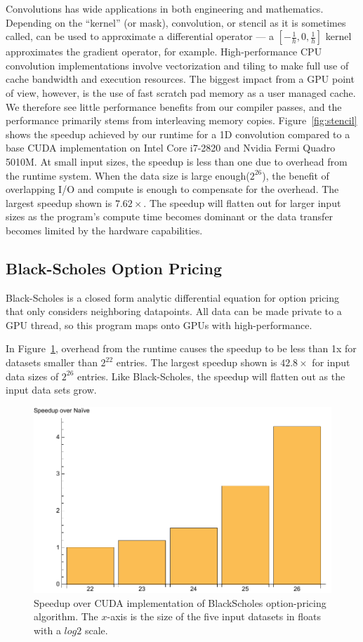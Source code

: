 Convolutions has wide applications in both engineering and mathematics.
Depending on the ``kernel'' (or mask), convolution, or stencil as it is sometimes called,   can be used to approximate a differential operator ---
 a $[-\frac{1}{h}, 0, \frac{1}{h}]$ kernel approximates the gradient operator, for example.
High-performance CPU convolution implementations
involve vectorization and tiling to make full use of cache bandwidth and
execution resources.
The biggest impact from a GPU point of view, however, is the use of fast
  scratch pad memory as a user managed cache.
We therefore see little performance benefits from our compiler passes, and the
  performance primarily stems from interleaving memory copies.
Figure~\ref{fig:stencil} shows the speedup achieved by our runtime for a 1D
  convolution compared to a base CUDA implementation on Intel Core i7-2820 and Nvidia Fermi Quadro 5010M.
At small input sizes, the speedup is less than one due to overhead from the
runtime system. When the data size is large enough($2^{26}$), the benefit of
overlapping I/O and compute is enough to compensate for the overhead. The
largest speedup shown is $7.62\times$. The speedup will flatten out for larger
input sizes as the program's compute time becomes dominant or the data transfer
becomes limited by the hardware capabilities.


\subsection{Black-Scholes Option Pricing}
Black-Scholes is a closed form analytic differential
  equation for option pricing that only
considers neighboring datapoints. All data can be made private to a GPU thread,
so this program maps onto GPUs with high-performance.

In Figure~\ref{fig:blackscholes}, overhead from the runtime causes the speedup to be less than 1x for datasets
smaller than $2^{22}$ entries. The largest speedup shown is $42.8\times$ for input
data sizes of $2^{26}$ entries. Like Black-Scholes, the speedup will flatten
out as the input data sets grow.

\begin{figure}
\centering
\includegraphics[scale=0.5]{data/blackscholes.pdf}
\caption{Speedup over CUDA implementation of BlackScholes option-pricing
algorithm. The $x$-axis is the size of the five input datasets in floats with
a $log2$ scale.}
\label{fig:blackscholes}
\centering
\end{figure}

